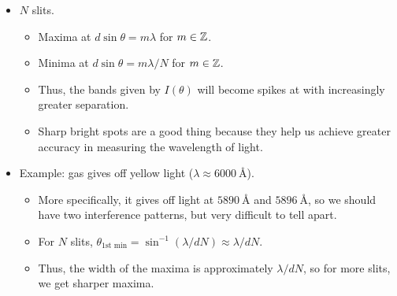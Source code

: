 \documentclass[../notes.tex]{subfiles}
\begin{document}
\begin{itemize}
\begin{itemize}
\begin{figure}[H]
\begin{subfigure}[b]{0.45\linewidth}
                \caption{Set angles.}
                \label{fig:phaserDiagramb}
            \end{subfigure}
            \caption{Phaser diagram for three cosines.}
            \label{fig:phaserDiagram}
        \end{figure}
        \begin{itemize}
            \item We can use a \textbf{phaser diagram}.
            \item From Figure \ref{fig:phaserDiagram}, we can see that if $\phi=\ang{120},\ang{240},\dots$, then we get cancellation. In other words, we must have $\Delta r=n\lambda/3$ for $\lambda\in\Z$.
        \end{itemize}
    \end{itemize}
    \item $N$ slits.
    \begin{itemize}
        \item Maxima at $d\sin\theta=m\lambda$ for $m\in\mathbb{Z}$.
        \item Minima at $d\sin\theta=m\lambda/N$ for $m\in\mathbb{Z}$.
        \item Thus, the bands given by $I(\theta)$ will become spikes at with increasingly greater separation.
        \item Sharp bright spots are a good thing because they help us achieve greater accuracy in measuring the wavelength of light.
    \end{itemize}
    \item Example:  gas gives off yellow light ($\lambda\approx\SI{6000}{\angstrom}$).
    \begin{itemize}
        \item More specifically, it gives off light at $\SI{5890}{\angstrom}$ and $\SI{5896}{\angstrom}$, so we should have two interference patterns, but very difficult to tell apart.
        \item For $N$ slits, $\theta_\text{1st min}=\sin^{-1}(\lambda/dN)\approx\lambda/dN$.
        \item Thus, the width of the maxima is approximately $\lambda/dN$, so for more slits, we get sharper maxima.

\end{itemize}
\end{itemize}
\end{document}
